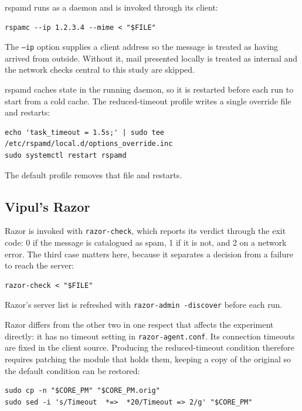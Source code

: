 rspamd runs as a daemon and is invoked through its client:

\begin{lstlisting}
rspamc --ip 1.2.3.4 --mime < "$FILE"
\end{lstlisting}

The \texttt{--ip} option supplies a client address so the message is treated as having arrived from outside. Without it, mail presented locally is treated as internal and the network checks central to this study are skipped.

rspamd caches state in the running daemon, so it is restarted before each run to
start from a cold cache. The reduced-timeout profile writes a single override file
and restarts:

\begin{lstlisting}
echo 'task_timeout = 1.5s;' | sudo tee /etc/rspamd/local.d/options_override.inc
sudo systemctl restart rspamd
\end{lstlisting}

The default profile removes that file and restarts.

\subsection{Vipul's Razor}

Razor is invoked with \texttt{razor-check}, which reports its verdict through the
exit code: 0 if the message is catalogued as spam, 1 if it is not, and 2 on a network
error. The third case matters here, because it separates a decision from a failure to
reach the server:

\begin{lstlisting}
razor-check < "$FILE"
\end{lstlisting}

Razor's server list is refreshed with \texttt{razor-admin -discover} before each run.

Razor differs from the other two in one respect that affects the experiment
directly: it has no timeout setting in \texttt{razor-agent.conf}. Its connection
timeouts are fixed in the client source. Producing the reduced-timeout condition
therefore requires patching the module that holds them, keeping a copy of the
original so the default condition can be restored:

\begin{lstlisting}
sudo cp -n "$CORE_PM" "$CORE_PM.orig"
sudo sed -i 's/Timeout  *=>  *20/Timeout => 2/g' "$CORE_PM"
\end{lstlisting}

